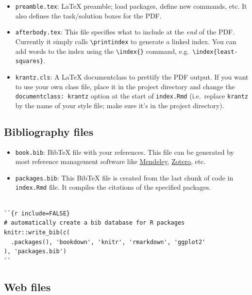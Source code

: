 \documentclass[
  oneside]{krantz}
\theoremstyle{definition}
\theoremstyle{definition}
\theoremstyle{definition}
\theoremstyle{remark}
\begin{document}
\begin{itemize}
\item
  \texttt{preamble.tex}: LaTeX preamble; load packages, define new commands, etc. It also defines the task/solution boxes for the PDF.
\item
  \texttt{afterbody.tex}: This file specifies what to include at the \emph{end} of the PDF. Currently it simply calls \texttt{\textbackslash{}printindex} to generate a linked index.
  You can add words to the index using the \texttt{\textbackslash{}index\{\}} command, e.g.~\texttt{\textbackslash{}index\{least-squares\}}.
\item
  \texttt{krantz.cls}: A LaTeX documentclass to prettify the PDF output. If you want to use your own class file, place it in the project directory and change
  the \texttt{documentclass:\ krantz} option at the start of \texttt{index.Rmd} (i.e.~replace \texttt{krantz} by the name of your style file; make sure it's in the project directory).
\end{itemize}

\hypertarget{bibliography-files}{%
\subsection*{Bibliography files}\label{bibliography-files}}


\begin{itemize}
\item
  \texttt{book.bib}: BibTeX file with your references. This file can be generated by most reference management software like \href{https://www.mendeley.com/}{Mendeley}, \href{https://www.zotero.org/}{Zotero}, etc.
\item
  \texttt{packages.bib}: This BibTeX file is created from the last chunk of code in \texttt{index.Rmd} file. It compiles the citations of the specified packages.
\end{itemize}

\begin{verbatim}

``{r include=FALSE}
# automatically create a bib database for R packages
knitr::write_bib(c(
  .packages(), 'bookdown', 'knitr', 'rmarkdown', 'ggplot2'
), 'packages.bib')
``
\end{verbatim}

\hypertarget{web-files}{%
\subsection*{Web files}\label{web-files}}
\end{document}
